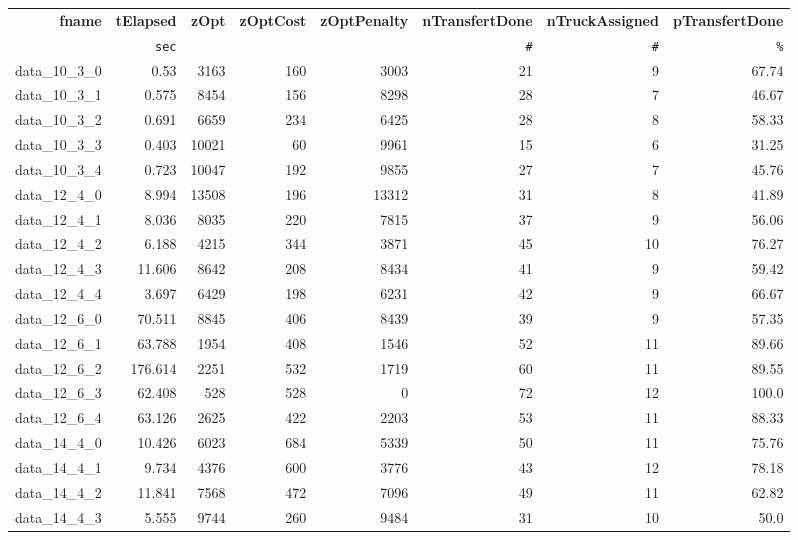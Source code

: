 \documentclass[preprint,12pt,authoryear]{elsarticle}
\begin{document}
\begin{table}[h!]
  \hspace{1.5cm}
  \vspace{0.5cm}
  \centering
{\tiny
\begin{tabular}{rrrrrrrr}
  \hline
  \textbf{fname} & \textbf{tElapsed} & \textbf{zOpt} & \textbf{zOptCost} & \textbf{zOptPenalty} & \textbf{nTransfertDone} & \textbf{nTruckAssigned} & \textbf{pTransfertDone} \\
  \texttt{ } & \texttt{sec} & \texttt{ } & \texttt{ } & \texttt{ } & \texttt{\#} & \texttt{\#} & \texttt{\%} \\\hline
  data\_10\_3\_0 & 0.53 & 3163 & 160 & 3003 & 21 & 9 & 67.74 \\
  data\_10\_3\_1 & 0.575 & 8454 & 156 & 8298 & 28 & 7 & 46.67 \\
  data\_10\_3\_2 & 0.691 & 6659 & 234 & 6425 & 28 & 8 & 58.33 \\
  data\_10\_3\_3 & 0.403 & 10021 & 60 & 9961 & 15 & 6 & 31.25 \\
  data\_10\_3\_4 & 0.723 & 10047 & 192 & 9855 & 27 & 7 & 45.76 \\
  data\_12\_4\_0 & 8.994 & 13508 & 196 & 13312 & 31 & 8 & 41.89 \\
  data\_12\_4\_1 & 8.036 & 8035 & 220 & 7815 & 37 & 9 & 56.06 \\
  data\_12\_4\_2 & 6.188 & 4215 & 344 & 3871 & 45 & 10 & 76.27 \\
  data\_12\_4\_3 & 11.606 & 8642 & 208 & 8434 & 41 & 9 & 59.42 \\
  data\_12\_4\_4 & 3.697 & 6429 & 198 & 6231 & 42 & 9 & 66.67 \\
  data\_12\_6\_0 & 70.511 & 8845 & 406 & 8439 & 39 & 9 & 57.35 \\
  data\_12\_6\_1 & 63.788 & 1954 & 408 & 1546 & 52 & 11 & 89.66 \\
  data\_12\_6\_2 & 176.614 & 2251 & 532 & 1719 & 60 & 11 & 89.55 \\
  data\_12\_6\_3 & 62.408 & 528 & 528 & 0 & 72 & 12 & 100.0 \\
  data\_12\_6\_4 & 63.126 & 2625 & 422 & 2203 & 53 & 11 & 88.33 \\
  data\_14\_4\_0 & 10.426 & 6023 & 684 & 5339 & 50 & 11 & 75.76 \\
  data\_14\_4\_1 & 9.734 & 4376 & 600 & 3776 & 43 & 12 & 78.18 \\
  data\_14\_4\_2 & 11.841 & 7568 & 472 & 7096 & 49 & 11 & 62.82 \\
  data\_14\_4\_3 & 5.555 & 9744 & 260 & 9484 & 31 & 10 & 50.0 \\

\end{tabular}}
\end{table}
\end{document}
